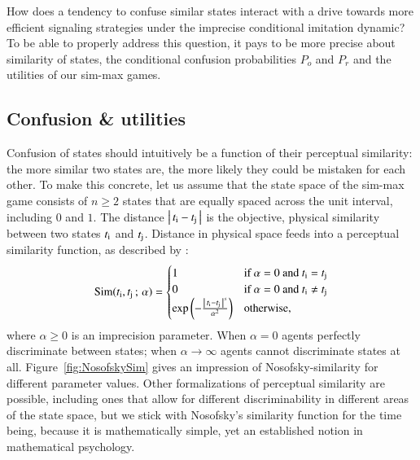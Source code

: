\documentclass[fleqn,reqno,10pt]{article}
\newcommand{\imprecision}{\ensuremath{\alpha}} %
\newcommand{\similarity}{\ensuremath{\mathrm{Sim}}} %
\begin{document}
How does a tendency to confuse similar states interact with a drive towards more efficient
signaling strategies under the imprecise conditional imitation dynamic? To be able to properly
address this question, it pays to be more precise about similarity of states, the conditional
confusion probabilities $P_o$ and $P_r$ and the utilities of our sim-max games.

\subsection{Confusion \& utilities}
\label{sec:iterated-diffusion}

Confusion of states should intuitively be a function of their perceptual similarity: the more
similar two states are, the more likely they could be mistaken for each other.  To make this
concrete, let us assume that the state space of the sim-max game consists of $n \ge 2$ states
that are equally spaced across the unit interval, including $0$ and $1$. The distance
$\left \lvert \, t_{\mathrm{i}} - t_{\mathrm{j}} \, \right\rvert$ is the objective, physical similarity between two states
$t_{\mathrm{i}}$ and $t_{\mathrm{j}}$. Distance in physical space feeds into a perceptual similarity
function, as described by \citet{Nosofsky1986:Attention-Simil}:
\begin{align*}
  \similarity(\mystate{i}, \mystate{j} \myts ; \myts \imprecision) =
      \begin{cases}
    1 & \textrm{if } \imprecision = 0 \textrm{ and } \mystate{i} = \mystate{j} \\
    0 & \textrm{if } \imprecision = 0 \textrm{ and } \mystate{i} \neq \mystate{j} \\
 \expo \left ( -  \frac{\card{\mystate{i} - \mystate{j}}^s}{ \imprecision^2} \right ) & \textrm{otherwise,} \\
    \end{cases}
\end{align*}
where $\imprecision \ge 0$ is an imprecision parameter. When $\imprecision=0$ agents perfectly
discriminate between states; when $\imprecision \rightarrow \infty$ agents cannot discriminate
states at all. Figure~\ref{fig:NosofskySim} gives an impression of Nosofsky-similarity for
different parameter values. Other formalizations of perceptual similarity are possible,
including ones that allow for different discriminability in different areas of the state space,
but we stick with Nosofsky's similarity function for the time being, because it is
mathematically simple, yet an established notion in mathematical psychology.
\end{document}

